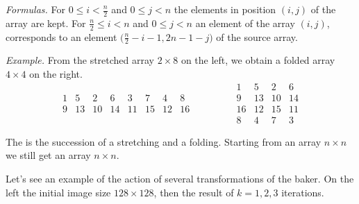 \documentclass[11pt,class=report,crop=false]{standalone}
\begin{document}
\begin{cours}
\begin{itemize}
\emph{Formulas.} 
For $0 \le i < \frac n2$ and $0 \le j < n$ the elements in position $(i,j)$ of the array are kept.
For $\frac n2 \le i < n$ and $0 \le j < n$ an element of the array 
$(i,j)$, corresponds to an element $\big(\frac{n}{2} - i - 1,2n-1-j\big)$ of the source array. 


\emph{Example.} 
From the stretched array $2 \times 8$ on the left, we obtain a folded array $4 \times 4$ on the right. 
$$ 
\begin{array}{cccccccc} 
  1& 5& 2& 6& 3& 7& 4& 8  \\
  9&13&10&14&11&15&12&16
\end{array}\qquad\qquad
\begin{array}{cccc} 
  1& 5& 2& 6\\ 
  9& 13& 10& 14\\  
  16&12&15&11\\  
  8&4&7&3  
\end{array}$$
\end{itemize}


The  is the succession of a stretching and a folding. Starting from an array $n \times n$ we still get an array $n \times n$.


Let's see an example of the action of several transformations of the baker.
On the left the initial image size $128 \times 128$, then the result of $k=1,2,3$ iterations. 


\end{cours}
\end{document}
